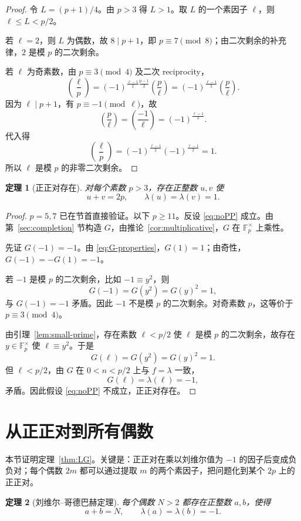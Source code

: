 \documentclass[11pt,a4paper]{ctexart}
\theoremstyle{plain}
\newtheorem{theorem}{定理}[section]
\theoremstyle{definition}
\newcommand{\Fpx}{\mathbb{F}_p^{\times}}
\newcommand{\li}{\lambda}
\newcommand{\leg}[2]{\left(\frac{#1}{#2}\right)}
\begin{document}
\begin{proof}
令 $L=(p+1)/4$。由 $p>3$ 得 $L>1$。取 $L$ 的一个素因子 $\ell$，则 $\ell\le L<p/2$。

若 $\ell=2$，则 $L$ 为偶数，故 $8\mid p+1$，即 $p\equiv7\pmod8$；由二次剩余的补充律，$2$ 是模 $p$ 的二次剩余。

若 $\ell$ 为奇素数，由 $p\equiv3\pmod4$ 及二次 reciprocity，
\[
  \leg{\ell}{p}
  =(-1)^{\frac{\ell-1}{2}\frac{p-1}{2}}\leg{p}{\ell}
  =(-1)^{\frac{\ell-1}{2}}\leg{p}{\ell}.
\]
因为 $\ell\mid p+1$，有 $p\equiv-1\pmod\ell$，故
\[
  \leg{p}{\ell}=\leg{-1}{\ell}=(-1)^{\frac{\ell-1}{2}}.
\]
代入得
\[
  \leg{\ell}{p}=(-1)^{\frac{\ell-1}{2}}(-1)^{\frac{\ell-1}{2}}=1.
\]
所以 $\ell$ 是模 $p$ 的非零二次剩余。
\end{proof}

\begin{theorem}[正正对存在]
\label{thm:positive-pair}
对每个素数 $p>3$，存在正整数 $u,v$ 使
\[
  u+v=2p,\qquad \li(u)=\li(v)=1.
\]
\end{theorem}

\begin{proof}
$p=5,7$ 已在节首直接验证。以下 $p\ge11$。反设 \eqref{eq:noPP} 成立。由第~\ref{sec:completion} 节构造 $G$，由推论~\ref{cor:multiplicative}，$G$ 在 $\Fpx$ 上乘性。

先证 $G(-1)=-1$。由 \eqref{eq:G-properties}，$G(1)=1$；由奇性，$G(-1)=-G(1)=-1$。

若 $-1$ 是模 $p$ 的二次剩余，比如 $-1\equiv y^2$，则
\[
  G(-1)=G(y^2)=G(y)^2=1,
\]
与 $G(-1)=-1$ 矛盾。因此 $-1$ 不是模 $p$ 的二次剩余。对奇素数 $p$，这等价于 $p\equiv3\pmod4$。

由引理~\ref{lem:small-prime}，存在素数 $\ell<p/2$ 使 $\ell$ 是模 $p$ 的二次剩余，故存在 $y\in\Fpx$ 使 $\ell\equiv y^2$。于是
\[
  G(\ell)=G(y^2)=G(y)^2=1.
\]
但 $\ell<p/2$，由 $G$ 在 $0<n<p/2$ 上与 $f=\li$ 一致，
\[
  G(\ell)=\li(\ell)=-1,
\]
矛盾。因此假设 \eqref{eq:noPP} 不成立，正正对存在。
\end{proof}

\section{从正正对到所有偶数}
\label{sec:reduction}

本节证明定理~\ref{thm:LG}。关键是：正正对在乘以刘维尔值为 $-1$ 的因子后变成负负对；每个偶数 $2m$ 都可以通过提取 $m$ 的两个素因子，把问题化到某个 $2p$ 上的正正对。

\begin{theorem}[刘维尔--哥德巴赫定理]
\label{thm:LG-proof}
每个偶数 $N>2$ 都存在正整数 $a,b$，使得
\[
  a+b=N,\qquad \li(a)=\li(b)=-1.
\]
\end{theorem}
\end{document}
